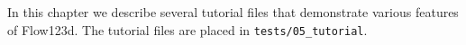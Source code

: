 \providecommand{\tightlist}{%
  \setlength{\itemsep}{0pt}\setlength{\parskip}{0pt}}
  

In this chapter we describe several tutorial files that demonstrate various features of Flow123d.
The tutorial files are placed in \texttt{tests/05\_tutorial}.









